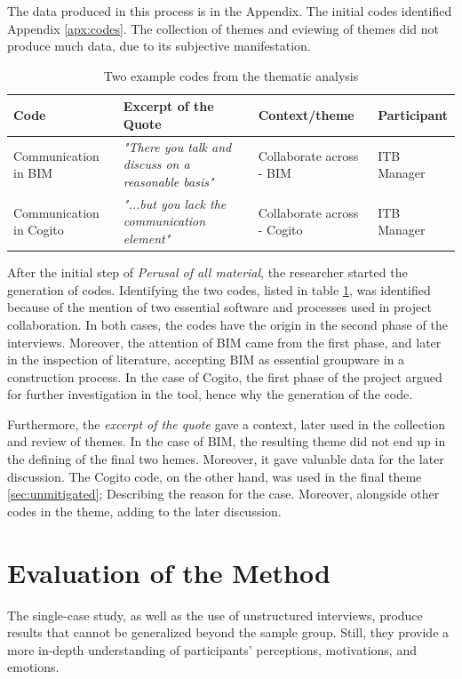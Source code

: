 The data produced in this process is in the Appendix. The initial codes identified Appendix \ref{apx:codes}. The collection of themes and eviewing of themes did not produce much data, due to its subjective manifestation. 

\begin{table}[]
    \centering
    \begin{tabular}{p{}p{}p{}l}
    \toprule
    \textbf{Code}           & \textbf{Excerpt of the Quote}                      & \textbf{Context/theme}      & \textbf{Participant} \\ \midrule
    Communication in BIM    & \textit{"There you talk and discuss on a reasonable basis"} & Collaborate across - BIM    & ITB Manager          \\
    Communication in Cogito & \textit{"...but you lack the communication element"}        & Collaborate across - Cogito & ITB Manager          \\ \bottomrule
    \end{tabular}
    \caption{Two example codes from the thematic analysis}
    \label{tab:code-example}
\end{table}

After the initial step of \textit{Perusal of all material}, the researcher started the generation of codes. Identifying the two codes, listed in table \ref{tab:code-example}, was identified because of the mention of two essential software and processes used in project collaboration. In both cases, the codes have the origin in the second phase of the interviews. Moreover, the attention of BIM came from the first phase, and later in the inspection of literature, accepting BIM as essential groupware in a construction process. In the case of Cogito, the first phase of the project argued for further investigation in the tool, hence why the generation of the code.

Furthermore, the \textit{excerpt of the quote} gave a context, later used in the collection and review of themes. In the case of BIM, the resulting theme did not end up in the defining of the final two hemes. Moreover, it gave valuable data for the later discussion. The Cogito code, on the other hand, was used in the final theme \ref{sec:unmitigated}; Describing the reason for the case. Moreover, alongside other codes in the theme, adding to the later discussion. 

\section{Evaluation of the Method}
The single-case study, as well as the use of unstructured interviews, produce results that cannot be generalized beyond the sample group. Still, they provide a more in-depth understanding of participants’ perceptions, motivations, and emotions. 

